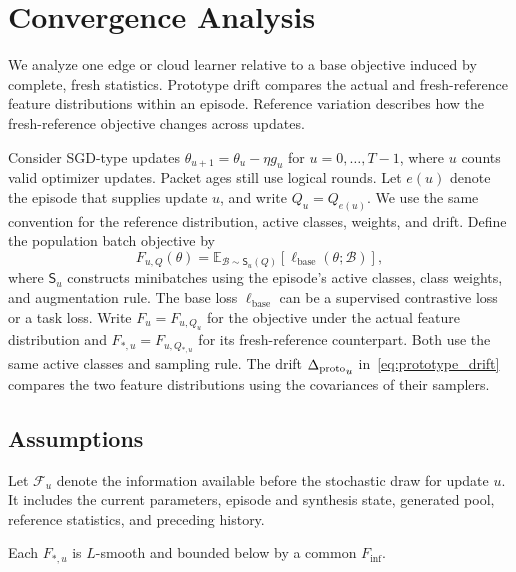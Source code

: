 \section{Convergence Analysis}
\label{sec:convergence}

We analyze one edge or cloud learner relative to a base objective induced by complete, fresh statistics. Prototype drift compares the actual and fresh-reference feature distributions within an episode. Reference variation describes how the fresh-reference objective changes across updates.

Consider SGD-type updates $\theta_{u+1}=\theta_u-\eta g_u$ for $u=0,\ldots,T-1$, where $u$ counts valid optimizer updates. Packet ages still use logical rounds. Let $e(u)$ denote the episode that supplies update $u$, and write $Q_u=Q_{e(u)}$. We use the same convention for the reference distribution, active classes, weights, and drift. Define the population batch objective by
\begin{equation}
 F_{u,Q}(\theta)=
 \mathbb E_{\mathcal B\sim\mathsf S_u(Q)}
 [\ell_{\mathrm{base}}(\theta;\mathcal B)],
 \label{eq:tier_objective}
\end{equation}
where $\mathsf S_u$ constructs minibatches using the episode's active classes, class weights, and augmentation rule. The base loss $\ell_{\mathrm{base}}$ can be a supervised contrastive loss or a task loss. Write $F_u=F_{u,Q_u}$ for the objective under the actual feature distribution and $F_{*,u}=F_{u,Q_{*,u}}$ for its fresh-reference counterpart. Both use the same active classes and sampling rule. The drift ${\Delta_{\mathrm{proto}}}_u$ in~\eqref{eq:prototype_drift} compares the two feature distributions using the covariances of their samplers.

\subsection{Assumptions}

Let $\mathcal F_u$ denote the information available before the stochastic draw for update $u$. It includes the current parameters, episode and synthesis state, generated pool, reference statistics, and preceding history.

\begin{assumption}
\label{asm:smooth}
Each $F_{*,u}$ is $L$-smooth and bounded below by a common $F_{\inf}$.
\end{assumption}

